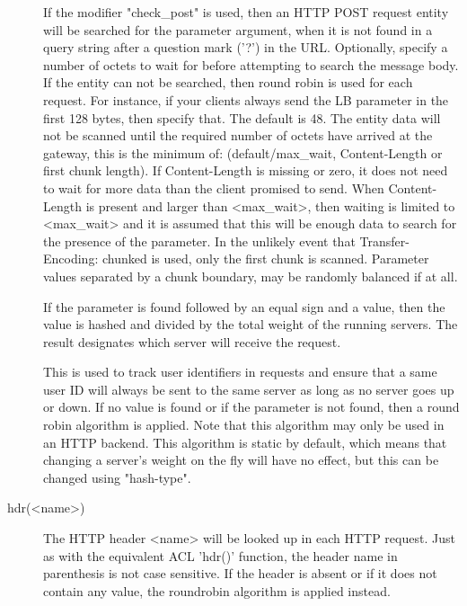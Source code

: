 \begin{description}
                  If the modifier "check\_post" is used, then an HTTP POST
                  request entity will be searched for the parameter argument,
                  when it is not found in a query string after a question mark
                  ('?') in the URL. Optionally, specify a number of octets to
                  wait for before attempting to search the message body. If the
                  entity can not be searched, then round robin is used for each
                  request. For instance, if your clients always send the LB
                  parameter in the first 128 bytes, then specify that. The
                  default is 48. The entity data will not be scanned until the
                  required number of octets have arrived at the gateway, this
                  is the minimum of: (default/max\_wait, Content-Length or first
                  chunk length). If Content-Length is missing or zero, it does
                  not need to wait for more data than the client promised to
                  send. When Content-Length is present and larger than
                  <max\_wait>, then waiting is limited to <max\_wait> and it is
                  assumed that this will be enough data to search for the
                  presence of the parameter. In the unlikely event that
                  Transfer-Encoding: chunked is used, only the first chunk is
                  scanned. Parameter values separated by a chunk boundary, may
                  be randomly balanced if at all.

                  If the parameter is found followed by an equal sign \chr{=} and
                  a value, then the value is hashed and divided by the total
                  weight of the running servers. The result designates which
                  server will receive the request.

                  This is used to track user identifiers in requests and ensure
                  that a same user ID will always be sent to the same server as
                  long as no server goes up or down. If no value is found or if
                  the parameter is not found, then a round robin algorithm is
                  applied. Note that this algorithm may only be used in an HTTP
                  backend. This algorithm is static by default, which means
                  that changing a server's weight on the fly will have no
                  effect, but this can be changed using "hash-type".

      \item[hdr(<name>)] The HTTP header <name> will be looked up in each HTTP
                  request. Just as with the equivalent ACL 'hdr()' function,
                  the header name in parenthesis is not case sensitive. If the
                  header is absent or if it does not contain any value, the
                  roundrobin algorithm is applied instead.


\end{description}
